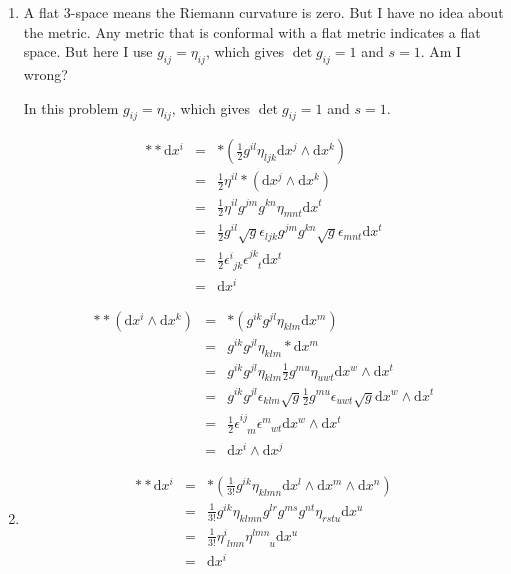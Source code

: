\documentclass[12pt,a4paper]{article}
\begin{document}
\begin{enumerate}
\item

{\color{red}A flat 3-space means the Riemann curvature is zero. But I have no idea about the metric. Any metric that is conformal with a flat metric indicates a flat space. But here I use $g_{ij}=\eta_{ij}$, which gives $\det g_{ij} =  1$ and $s=1$. Am I wrong?}

In this problem $g_{ij}=\eta_{ij}$, which gives $\det g_{ij} =  1$ and $s=1$.

\begin{eqnarray*}
	**\mathrm dx^i &=& * (\frac12 g^{il}\eta_{ljk}\mathrm dx^j\wedge\mathrm dx^k) \\
	&=& \frac 1 2 \eta^{il} *(\mathrm dx^j\wedge\mathrm d x^k ) \\
	&=& \frac 1 2 \eta^{il} g^{jm}g^{kn} \eta_{mnt}\mathrm dx^t \\
	&=& \frac12g^{il} \sqrt g \epsilon_{ljk} g^{jm}g^{kn} \sqrt g \epsilon_{mnt} \mathrm dx^t   \\
	&=& \frac{1}{2}\epsilon^{i}_{\phantom ijk}\epsilon^{jk}_{\phantom{jk}t}\mathrm dx^t \\
	&=&\mathrm dx^i
\end{eqnarray*}

\begin{eqnarray*}
	**(\mathrm dx^i\wedge\mathrm dx^k) &=& *(g^{ik}g^{jl}\eta_{klm}\mathrm dx^m) \\
	&=& g^{ik}g^{jl} \eta_{klm} * \mathrm dx^m \\
	&=& g^{ik}g^{jl} \eta_{klm} \frac12 g^{mu}\eta_{uwt}\mathrm dx^w\wedge\mathrm dx^t \\
	&=& g^{ik}g^{jl} \epsilon_{klm}\sqrt g \frac12 g^{mu}\epsilon_{uwt}\sqrt g \mathrm dx^w \wedge \mathrm dx^t \\
	&=& \frac12 \epsilon^{ij}_{\phantom {ij}m}\epsilon^m_{\phantom m wt}\mathrm dx^w\wedge\mathrm dx^t \\
	&=& \mathrm dx^i\wedge\mathrm dx^j
\end{eqnarray*}





\item
\begin{eqnarray*}
	**\mathrm dx^i &=& * (\frac1{3!}g^{ik}\eta_{klmn} \mathrm dx^l\wedge \mathrm dx^m \wedge \mathrm dx^n) \\
	&=& \frac{1}{3!}g^{ik}\eta_{klmn}g^{lr}g^{ms}g^{nt}\eta_{rstu}\mathrm dx^u \\
	&=& \frac{1}{3!} \eta^{i}_{\phantom ilmn} \eta^{lmn}_{\phantom {lmn}u}\mathrm dx^u \\
	&=&\mathrm dx^i
\end{eqnarray*}


\end{enumerate}
\end{document}
